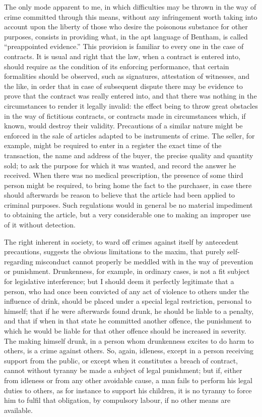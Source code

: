 \documentclass[11pt,openany]{book}
\begin{document}
The only mode apparent to me, in which difficulties may be thrown in the way of crime committed through this means, without any infringement worth taking into account upon the liberty of those who desire the poisonous substance for other purposes, consists in providing what, in the apt language of Bentham, is called ``preappointed evidence.'' This provision is familiar to every one in the case of contracts. It is usual and right that the law, when a contract is entered into, should require as the condition of its enforcing performance, that certain formalities should be observed, such as signatures, attestation of witnesses, and the like, in order that in case of subsequent dispute there may be evidence to prove that the contract was really entered into, and that there was nothing in the circumstances to render it legally invalid: the effect being to throw great obstacles in the way of fictitious contracts, or contracts made in circumstances which, if known, would destroy their validity. Precautions of a similar nature might be enforced in the sale of articles adapted to be instruments of crime. The seller, for example, might be required to enter in a register the exact time of the transaction, the name and address of the buyer, the precise quality and quantity sold; to ask the purpose for which it was wanted, and record the answer he received. When there was no medical prescription, the presence of some third person might be required, to bring home the fact to the purchaser, in case there should afterwards be reason to believe that the article had been applied to criminal purposes. Such regulations would in general be no material impediment to obtaining the article, but a very considerable one to making an improper use of it without detection.

The right inherent in society, to ward off crimes against itself by antecedent precautions, suggests the obvious limitations to the maxim, that purely self-regarding misconduct cannot properly be meddled with in the way of prevention or punishment. Drunkenness, for example, in ordinary cases, is not a fit subject for legislative interference; but I should deem it perfectly legitimate that a person, who had once been convicted of any act of violence to others under the influence of drink, should be placed under a special legal restriction, personal to himself; that if he were afterwards found drunk, he should be liable to a penalty, and that if when in that state he committed another offence, the punishment to which he would be liable for that other offence should be increased in severity. The making himself drunk, in a person whom drunkenness excites to do harm to others, is a crime against others. So, again, idleness, except in a person receiving support from the public, or except when it constitutes a breach of contract, cannot without tyranny be made a subject of legal punishment; but if, either from idleness or from any other avoidable cause, a man fails to perform his legal duties to others, as for instance to support his children, it is no tyranny to force him to fulfil that obligation, by compulsory labour, if no other means are available.
\end{document}

